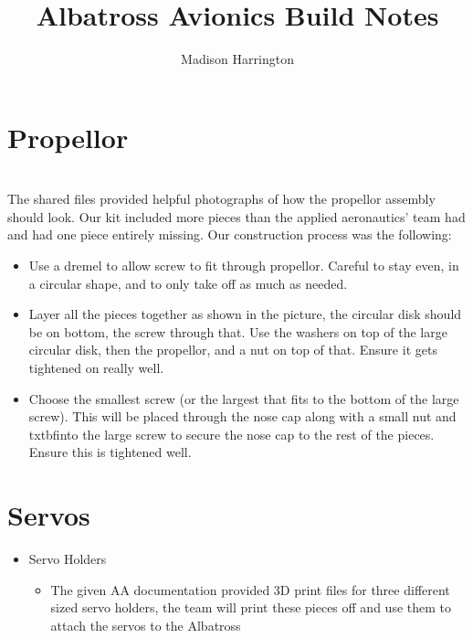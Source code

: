 \documentclass{article}
\begin{document}
\title{Albatross Avionics Build Notes}
\author{Madison Harrington}
\maketitle



\section{Propellor} \\

The shared files provided helpful photographs of how the propellor assembly should look. Our kit included more pieces than the applied aeronautics' team had and had one piece entirely missing. Our construction process was the following: 

\begin{itemize}

\item Use a dremel to allow screw to fit through propellor. Careful to stay even, in a circular shape, and to only take off as much as needed. 
\item Layer all the pieces together as shown in the picture, the circular disk should be on bottom, the screw through that. Use the washers
on top of the large circular disk, then the propellor, and a nut on top of that. Ensure it gets tightened on really well. 
\item Choose the smallest screw (or the largest that fits to the bottom of the large screw). This will be placed through the nose cap 
along with a small nut and txtbf{into the large screw} to secure the nose cap to the rest of the pieces. Ensure this is tightened well.

\end{itemize}



\section{Servos}

\begin{itemize} 

\item Servo Holders

   \begin {itemize}
   
   \item The given AA documentation provided 3D print files for three different sized servo holders, the team will print these    
   pieces off and use them to attach the servos to the Albatross
   
   \end{itemize}
   
\end{itemize}  
\end{document}
